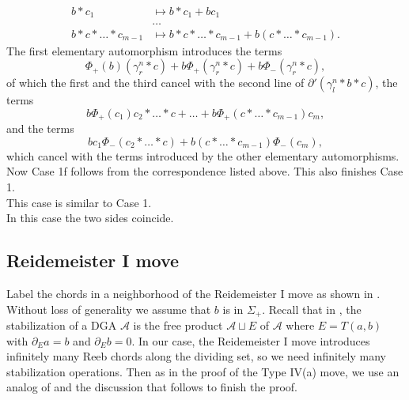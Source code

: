 \documentclass[11pt]{amsart}
\makeatletter
\renewenvironment{proof}[1][\proofname] {\par\pushQED{\qed}{\normalfont\bfseries\topsep6\p@\@plus6\p@\relax #1\@addpunct{.} }}{\popQED\endtrivlist\@endpefalse}
\theoremstyle{mystyle}
\newcommand{\<}{\langle}
\renewcommand{\>}{\rangle}
\makeatother
\begin{document}
\begin{proof}
\begin{align*}
        b * c_1 &\mapsto b * c_1 + b c_1 \\
        &\dots \\
        b * c * \dots * c_{m-1} &\mapsto b * c * \dots * c_{m-1} + b(c * \dots * c_{m-1}).
    \end{align*} The first elementary automorphism introduces the terms \[\Phi_+(b)(\gamma_r^n * c) + b\Phi_+(\gamma_r^n * c) + b\Phi_-(\gamma_r^n * c),\] of which the first and the third cancel with the second line of $\partial'(\gamma_l^n * b * c)$, the terms \[b\Phi_+(c_1) c_2 * \dots * c + \dots + b \Phi_+(c * \dots * c_{m-1})c_m,\] and the terms \[bc_1\Phi_-(c_2 * \dots * c) + b(c * \dots * c_{m-1}) \Phi_-(c_m),\] which cancel with the terms introduced by the other elementary automorphisms. Now Case 1f follows from the correspondence listed above. This also finishes Case 1. \\

     This case is similar to Case 1. \\
    
     In this case the two sides coincide.
\end{proof}

\subsection{Reidemeister I move} \text{ }
Label the chords in a neighborhood of the Reidemeister I move as shown in . Without loss of generality we assume that $b$ is in $\Sigma_+$. Recall that in \cite{chekanov2002dga}, the stabilization of a DGA $\mathcal{A}$ is the free product $\mathcal{A} \sqcup E$ of $\mathcal{A}$ where $E = T(a, b)$ with $\partial_E a = b$ and $\partial_E b = 0$. In our case, the Reidemeister I move introduces infinitely many Reeb chords along the dividing set, so we need infinitely many stabilization operations. Then as in the proof of the Type IV(a) move, we use an analog of \cite[Lemma 8.2]{chekanov2002dga} and the discussion that follows to finish the proof. 
	
\end{document}
